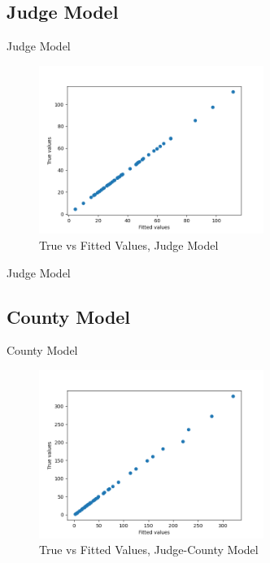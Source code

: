 \documentclass[11pt, oneside]{article}   	%
\theoremstyle{ModifiedStyle}
\begin{document}
		  \subsection{Judge Model}

		    \begin{table}[H]
		      \centering
		      \caption{Judge Model}
		      
		    \end{table}

		    \begin{figure}[H]
		      \centering
		      \includegraphics[width=0.65\textwidth]{../../output/figures/Exploration/fit_min_JudgeID}
		      \caption{True vs Fitted Values, Judge Model}
		    \end{figure}

		    \begin{table}[H]
		      \centering
		      \caption{Judge Model}
		      
		    \end{table}

		  \subsection{County Model}

		    \begin{table}[H]
		      \centering
		      \caption{County Model}
		      
		    \end{table}

		    \begin{figure}[H]
		      \centering
		      \includegraphics[width=0.65\textwidth]{../../output/figures/Exploration/fit_min_County}
		      \caption{True vs Fitted Values, Judge-County Model}
		    \end{figure}
\end{document}
